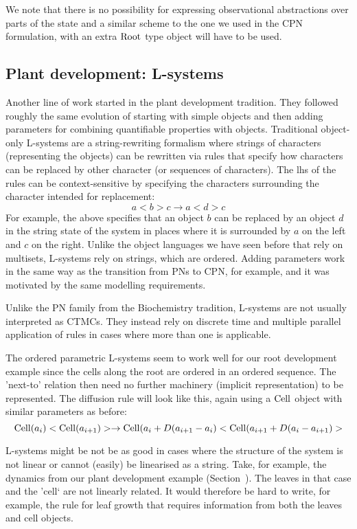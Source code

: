 We note that there is no possibility for expressing observational abstractions
over parts of the state and a similar scheme to the one we used in the CPN
formulation, with an extra $\mathrm{Root}$ type object will have to be used.


\subsection{Plant development: L-systems}
\label{subsec:lSystems}
Another line of work started in the plant development tradition.
They followed roughly the same evolution of starting with simple objects and
then adding parameters for combining quantifiable properties with
objects. Traditional object-only L-systems are a string-rewriting formalism
where strings of characters (representing the objects) can be rewritten via
rules that specify how characters can be replaced by other character (or
sequences of characters). The lhs of the rules can be context-sensitive by
specifying the characters surrounding the character intended for replacement:
$$
a< b > c \rightarrow a < d > c
$$
For example, the above specifies that an object $b$ can be replaced by an object
$d$ in the string state of the system in places where it is surrounded by $a$ on
the left and $c$ on the right. Unlike the object languages we have seen before
that rely on multisets, L-systems rely on strings, which are ordered. Adding
parameters work in the same way as the transition from PNs to CPN, for example,
and it was motivated by the same modelling requirements.

Unlike the PN family from the Biochemistry tradition, L-systems are not usually
interpreted as CTMCs. They instead rely on discrete time and multiple parallel
application of rules in cases where more than one is applicable.

The ordered parametric L-systems seem to work well for our root development
example since the cells along the root are ordered in an ordered sequence. The
'next-to' relation then need no further machinery (implicit representation) to
be represented. The diffusion rule will look like this, again using a
$\mathrm{Cell}$ object with similar parameters as before:
$$
\mathrm{Cell}(a_i)< \mathrm{Cell}(a_{i+1}) > \rightarrow \mathrm{Cell}(a_i+D(a_{i+1}-a_i)< \mathrm{Cell}(a_{i+1}+D(a_i-a_{i+1}) >
$$

L-systems might be not be as good in cases where the structure of the system is
not linear or cannot (easily) be linearised as a string. Take, for example, the
dynamics from our plant development example (Section~). The
leaves in that case and the 'cell` are not linearly related. It would therefore
be hard to write, for example, the rule for leaf growth that requires
information from both the leaves and cell objects.

